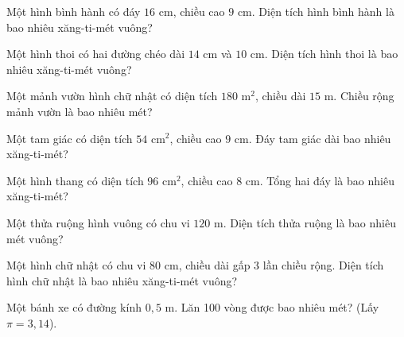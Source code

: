 \begin{ex}
  Một hình bình hành có đáy $16\text{ cm}$, chiều cao $9\text{ cm}$. Diện tích hình bình hành là bao nhiêu xăng-ti-mét vuông?
\end{ex}

\begin{ex}
  Một hình thoi có hai đường chéo dài $14\text{ cm}$ và $10\text{ cm}$. Diện tích hình thoi là bao nhiêu xăng-ti-mét vuông?
\end{ex}

\begin{ex}
  Một mảnh vườn hình chữ nhật có diện tích $180\text{ m}^2$, chiều dài $15\text{ m}$. Chiều rộng mảnh vườn là bao nhiêu mét?
\end{ex}

\begin{ex}
  Một tam giác có diện tích $54\text{ cm}^2$, chiều cao $9\text{ cm}$. Đáy tam giác dài bao nhiêu xăng-ti-mét?
\end{ex}

\begin{ex}
  Một hình thang có diện tích $96\text{ cm}^2$, chiều cao $8\text{ cm}$. Tổng hai đáy là bao nhiêu xăng-ti-mét?
\end{ex}

\begin{ex}
  Một thửa ruộng hình vuông có chu vi $120\text{ m}$. Diện tích thửa ruộng là bao nhiêu mét vuông?
\end{ex}

\begin{ex}
  Một hình chữ nhật có chu vi $80\text{ cm}$, chiều dài gấp 3 lần chiều rộng. Diện tích hình chữ nhật là bao nhiêu xăng-ti-mét vuông?
\end{ex}

\begin{ex}
  Một bánh xe có đường kính $0{,}5\text{ m}$. Lăn 100 vòng được bao nhiêu mét? (Lấy $\pi = 3{,}14$).
\end{ex}

